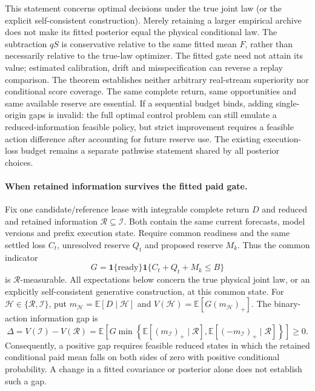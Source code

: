 \documentclass[10pt]{article}
\begin{document}
This statement concerns optimal decisions under the true joint law (or the
explicit self-consistent construction).  Merely retaining a larger empirical
archive does not make its fitted posterior equal the physical conditional
law.  The subtraction $qS$ is conservative relative to the same fitted
mean $F$, rather than necessarily relative to the true-law optimizer.
The fitted gate need not attain its value; estimated calibration, drift and misspecification
can reverse a replay comparison.  The theorem establishes neither arbitrary
real-stream superiority nor conditional score coverage.  The same complete
return, same opportunities and same available reserve are essential.  If a
sequential budget binds, adding single-origin gaps is invalid: the full optimal
control problem can still emulate a reduced-information feasible policy, but
strict improvement requires a feasible action difference after accounting for
future reserve use.  The existing execution-loss budget remains a separate
pathwise statement shared by all posterior choices.

\paragraph{When retained information survives the fitted paid gate.}
Fix one candidate/reference lease with integrable complete return $D$ and
reduced and retained information $\mathcal R\subseteq\mathcal I$.
Both contain the same current forecasts, model versions and prefix execution
state.  Require common readiness and the same settled loss $C_t$, unresolved
reserve $Q_t$ and proposed reserve $M_k$.  Thus the common indicator
\begin{equation}
 G=\mathbf1\{\text{ready}\}\mathbf1\{C_t+Q_t+M_k\leq B\}
 \label{eq:final-paid-common-feasibility}
\end{equation}
is $\mathcal R$-measurable.  All expectations below concern the true physical
joint law, or an explicitly self-consistent generative construction, at this
common state.  For $\mathcal H\in\{\mathcal R,\mathcal I\}$, put
$m_{\mathcal H}=\mathbb E[D\mid\mathcal H]$ and
$V(\mathcal H)=\mathbb E[G(m_{\mathcal H})_+]$.
The binary-action information gap is
\begin{equation}
 \Delta=V(\mathcal I)-V(\mathcal R)
 =\mathbb E\!\left[G\min\!\left\{
 \mathbb E[(m_{\mathcal I})_+\mid\mathcal R],
 \mathbb E[(-m_{\mathcal I})_+\mid\mathcal R]\right\}\right]\geq0.
 \label{eq:final-paid-information-gap}
\end{equation}
Consequently, a positive gap requires feasible reduced states in which the
retained conditional paid mean falls on both sides of zero with positive
conditional probability.  A change in a fitted covariance or posterior
alone does not establish such a gap.
\end{document}
